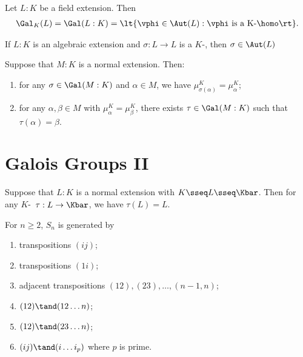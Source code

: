 \documentclass{article}
\begin{document}
\begin{tdefinition}
  Let \( L:K \) be a field extension.
  Then \begin{align*}
    \Gal_K(L) = \Gal(L:K) = \lt\{ \vphi\in\Aut(L) : \vphi\text{ is a K-\homo} \rt\}.
  \end{align*}
\end{tdefinition}


\vspace{-.75em}
\begin{ttheorem}
  If \( L:K \) is an algebraic extension and \( \sigma:L\to L \) is a \( K \)-\homo, then \( \sigma\in\Aut(L) \)
\end{ttheorem}

\begin{tlemma}
  Suppose that \( M:K \) is a normal extension.
  Then: \begin{enumerate}[label=(\alph*)]
    \item for any \( \sigma\in\Gal(M:K) \) and \( \alpha\in M \), we have \( \mu_{\sigma(\alpha)}^K=\mu_\alpha^K \);
    \item for any \( \alpha,\beta\in M \) with \( \mu_\alpha^K=\mu_\beta^K \), there exists \( \tau\in\Gal(M:K) \) such that \( \tau(\alpha)=\beta \).
  \end{enumerate}
\end{tlemma}
\section{Galois Groups II}
\begin{tlemma}
  Suppose that \( L:K \) is a normal extension with \( K\sseq L\sseq \Kbar \).
  Then for any \( K \)-\homo~\( \tau:L\to \Kbar \), we have \( \tau(L) = L \).
\end{tlemma}

\begin{tlemma}
  For \( n\geq 2 \), \( S_n \) is generated by \begin{enumerate}
    \item transpositions \( (ij) \);
    \item transpositions \( (1i) \);
    \item adjacent transpositions \( (12),(23),\ldots,(n-1, n) \);
    \item \( (12)\tand (12\ldots n) \);
    \item \( (12)\tand (23\ldots n) \);
    \item \( (ij)\tand (i\ldots i_p) \) where \( p \) is prime.
  \end{enumerate}
\end{tlemma}
\end{document}
